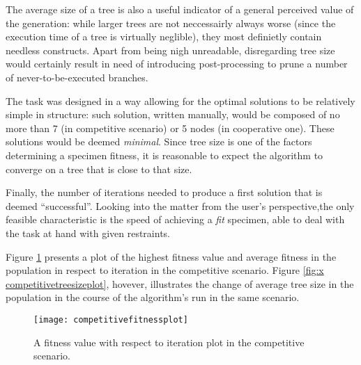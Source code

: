 The average size of a tree is also a useful indicator of a general perceived value of the generation: while larger trees are not neccessairly always worse (since the execution time of a tree is virtually neglible), they most definietly contain needless constructs. Apart from being nigh unreadable, disregarding tree size would certainly result in need of introducing post-processing to prune a number of never-to-be-executed branches.

The task was designed in a way allowing for the optimal solutions to be relatively simple in structure: such solution, written manually, would be composed of no more than 7 (in competitive scenario) or 5 nodes (in cooperative one). These solutions would be deemed \textit{minimal}. Since tree size is one of the factors determining a specimen fitness, it is reasonable to expect the algorithm to converge on a tree that is close to that size.

Finally, the number of iterations needed to produce a first solution that is deemed ``successful''. Looking into the matter from the user's perspective,the only feasible characteristic is the speed of achieving a \textit{fit} specimen, able to deal with the task at hand with given restraints.

Figure \ref{fig:x competitivefitnessplot} presents a plot of the highest fitness value and average fitness in the population in respect to iteration in the competitive scenario. Figure \ref{fig:x competitivetreesizeplot}, hovever, illustrates the change of average tree size in the population in the course of the algorithm's run in the same scenario.

\begin{figure}[h]
    \centering
    \texttt{[image: competitivefitnessplot]}
    \caption{A fitness value with respect to iteration plot in the competitive scenario.}
    \label{fig:x competitivefitnessplot}
\end{figure}

